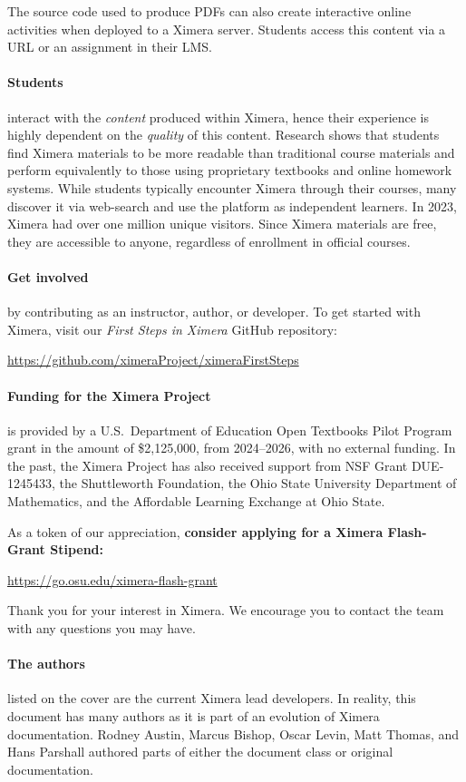 \documentclass{ximera}
\begin{document}
The source code used to produce PDFs can also create interactive online
activities when deployed to a Ximera server. Students access this content via a
URL or an assignment in their LMS.


\paragraph{Students} interact with the \textit{content} produced within
Ximera, hence their experience is highly dependent on the \textit{quality} of this
content. Research shows that students find Ximera materials to be more readable
than traditional course materials and perform equivalently to those using
proprietary textbooks and online homework systems. While students typically
encounter Ximera through their courses, many discover it via web-search and
use the platform as independent learners. In 2023, Ximera had over one million
unique visitors. Since Ximera materials are free, they are accessible to
anyone, regardless of enrollment in official courses.




\paragraph{Get involved} by contributing as an instructor, author,
or developer. To get started with Ximera, visit our
\textit{First Steps in Ximera} GitHub repository:
\begin{center}
    \url{https://github.com/ximeraProject/ximeraFirstSteps}
\end{center}

\paragraph{Funding for the Ximera Project} is provided by
a U.S.\ Department of Education Open Textbooks Pilot Program grant in the
amount of \$2,125,000, from 2024--2026, with no external funding.
In the past, the Ximera Project has
also received support from NSF Grant DUE-1245433, the Shuttleworth
Foundation, the Ohio State University
Department of Mathematics, and the Affordable Learning Exchange at Ohio State.

As a token of our appreciation, \textbf{consider applying for a Ximera
    Flash-Grant Stipend:}
\begin{center}
    \url{https://go.osu.edu/ximera-flash-grant}
\end{center}
Thank you for your interest in Ximera. We encourage you to contact the
team with any questions you may have.

\paragraph{The authors} listed on the cover are the current Ximera lead
developers. In reality, this document has many authors as it is part of an
evolution of Ximera documentation. Rodney Austin, Marcus Bishop, Oscar Levin, Matt Thomas, and Hans
Parshall authored parts of either the document class or original
documentation.
\end{document}
